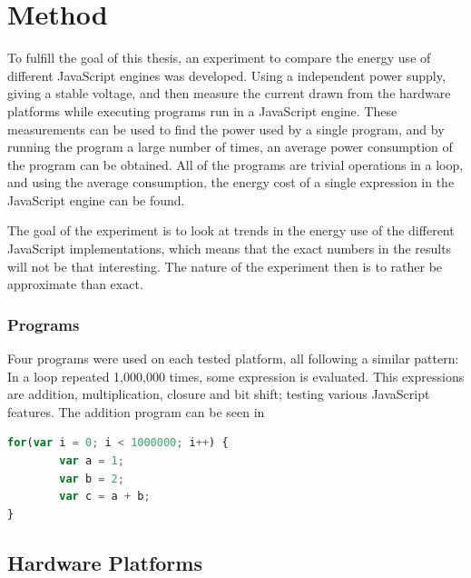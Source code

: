\chapter{Method}
\label{ch:chapter2}


To fulfill the goal of this thesis, an experiment to compare the energy use of different JavaScript engines was developed. Using a independent power supply, giving a stable voltage, and then measure the current drawn from the hardware platforms while executing programs run in a JavaScript engine. These measurements can be used to find the power used by a single program, and by running the program a large number of times, an average power consumption of the program can be obtained. All of the programs are trivial operations in a loop, and using the average consumption, the energy cost of a single expression in the JavaScript engine can be found.

The goal of the experiment is to look at trends in the energy use of the different JavaScript implementations, which means that the exact numbers in the results will not be that interesting. The nature of the experiment then is to rather be approximate than exact.



\subsection{Programs}
Four programs were used on each tested platform, all following a similar pattern: In a loop repeated 1,000,000 times, some expression is evaluated.
This expressions are addition, multiplication, closure and bit shift; testing various JavaScript features.
The addition program can be seen in 


\begin{lstlisting}[language=JavaScript,caption={Addition program}, label={lst:add}]
for(var i = 0; i < 1000000; i++) {
        var a = 1;
        var b = 2;
        var c = a + b;
}
\end{lstlisting}




\section{Hardware Platforms}

